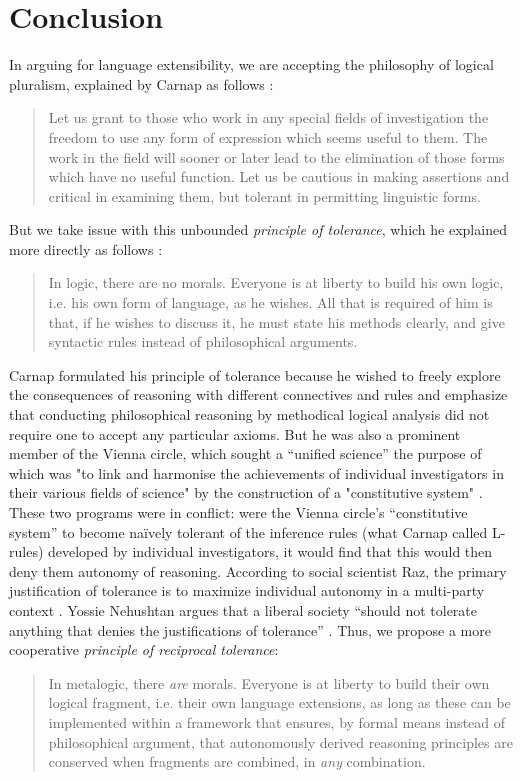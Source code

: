 \section{Conclusion}\label{conclusion}
In arguing for language extensibility, we are accepting the philosophy of logical pluralism, explained by Carnap as follows \cite{carnap:1950b}:
\begin{quote}
Let us grant to those who work in any special fields of investigation the freedom to use any form of expression which seems useful to them. The work in the field will sooner or later lead to the elimination of those forms which have no useful function. Let us be cautious in making assertions and critical in examining them, but tolerant in permitting linguistic forms.
\end{quote}
But we take issue with this unbounded \emph{principle of tolerance}, which he explained more directly as follows \cite{CarnapR:logsl}:
\begin{quote}
In logic, there are no morals. Everyone is at liberty to build his own logic, i.e. his own form of language, as he wishes. All that is required of him is that, if he wishes to discuss it, he must state his methods clearly, and give syntactic rules instead of philosophical arguments.
\end{quote}

Carnap formulated his principle of tolerance because he wished to freely explore the consequences of reasoning with different connectives and  rules and emphasize that conducting philosophical reasoning by methodical logical analysis did not require one to accept any particular axioms. But he was also a prominent member of the Vienna circle, which sought a ``unified science'' the purpose of which was "to link and harmonise the achievements of individual investigators in their various fields of science" by the construction of a "constitutive system" \cite{hahn1929scientific}. These two programs were in conflict: were the Vienna circle's ``constitutive system'' to become na\"ively tolerant of the inference rules (what Carnap called L-rules) developed by individual investigators, it would find that this would then deny them autonomy of reasoning. According to social scientist Raz, the primary justification of tolerance is to maximize 
individual autonomy in a multi-party context \cite{raz1988autonomy}. Yossie Nehushtan argues that a liberal  society ``should not tolerate anything that denies the justifications of tolerance'' \cite{nehushtan2007limits}. Thus, we propose a more cooperative \emph{principle of reciprocal tolerance}:
\begin{quote}
In metalogic, there \emph{are} morals. Everyone is at liberty to build their own logical fragment, i.e. their own language extensions, as long as these can be implemented within a framework that ensures, by formal means instead of philosophical argument, that autonomously derived reasoning principles are conserved when fragments are combined, in \emph{any} combination.
\end{quote}

